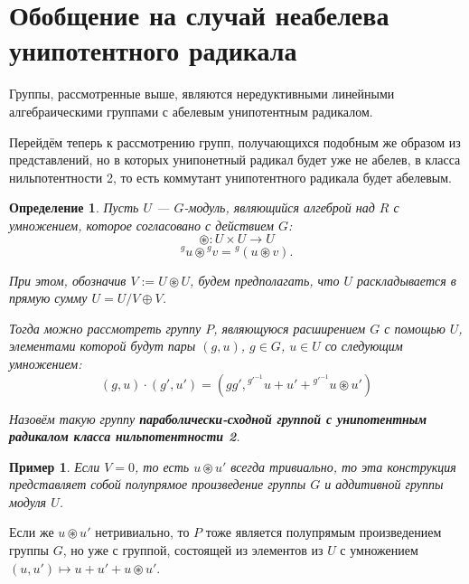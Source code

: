 \documentclass[12pt]{matmex-diploma}
\theoremstyle{mystyleni}
\theoremstyle{mystyle}
\newtheorem{example}{Пример}
\newtheorem{definition}{Определение}
\newenvironment{framed}
    {
\vspace{1.5ex}
\begin{tcolorbox}[colback=white, grow to left by=1.2em, grow to right by=1.2em, enhanced]
    }
    {
\end{tcolorbox}
    }
\begin{document}
\section{Обобщение на случай неабелева унипотентного радикала}

Группы, рассмотренные выше, являются нередуктивными линейными алгебраическими группами с абелевым унипотентным радикалом.

Перейдём теперь к рассмотрению групп, получающихся подобным же образом из представлений, но в которых унипонетный радикал будет уже не абелев, в класса нильпотентности 2, то есть коммутант унипотентного радикала будет абелевым.

\begin{framed}
\begin{definition}
Пусть $U$ --- $G$-модуль, являющийся алгеброй над $R$ с умножением, которое согласовано с действием $G$:
$$\circledast : U \times U \to U$$
$$ {}^g u \circledast {}^g v = {}^g (u \circledast v) .$$

При этом, обозначив $V:=U\circledast U$, будем предполагать, что $U$ раскладывается в прямую сумму $U = U/V \oplus V$.

Тогда можно рассмотреть группу $P$, являющуюся расширением $G$ с помощью $U$, элементами которой будут пары $(g,u)$, $g \in G$, $u \in U$ со следующим умножением:
$$
(g,u)\cdot (g',u') = (g g', {}^{g'^{-1}} u + u' + {}^{g'^{-1}} u \circledast u')
$$

Назовём такую группу \textit{\textbf{параболически-сходной группой с унипотентным радикалом класса нильпотентности 2}}.
\end{definition}
\end{framed}

\begin{example}
Если $V=0$, то есть $u \circledast u'$ всегда тривиально, то эта конструкция представляет собой полупрямое произведение группы $G$ и аддитивной группы модуля $U$.
\end{example}

Если же $u \circledast u'$ нетривиально, то $P$ тоже является полупрямым произведением группы $G$, но уже с группой, состоящей из элементов из $U$ с умножением
$
(u,u') \mapsto u + u' + u \circledast u'
$.
\end{document}

